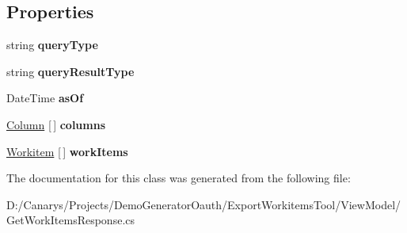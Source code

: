 \subsection*{Properties}
\begin{DoxyCompactItemize}
\item 
\mbox{\label{class_templates_generator_tool_1_1_view_model_1_1_get_work_items_response_1_1_results_ad097654d3c3272b51763ff99d77a27b6}} 
string {\bfseries query\+Type}
\item 
\mbox{\label{class_templates_generator_tool_1_1_view_model_1_1_get_work_items_response_1_1_results_a248db1d152bcfff6a9d7ba9ff21d4f5c}} 
string {\bfseries query\+Result\+Type}
\item 
\mbox{\label{class_templates_generator_tool_1_1_view_model_1_1_get_work_items_response_1_1_results_a7f4860e5679fa71f02e35bde6c3e69cf}} 
Date\+Time {\bfseries as\+Of}
\item 
\mbox{\label{class_templates_generator_tool_1_1_view_model_1_1_get_work_items_response_1_1_results_aefea24688f8ef1eb424dfe4c522c3c2b}} 
\mbox{\hyperlink{class_templates_generator_tool_1_1_view_model_1_1_get_work_items_response_1_1_column}{Column}} \mbox{[}$\,$\mbox{]} {\bfseries columns}
\item 
\mbox{\label{class_templates_generator_tool_1_1_view_model_1_1_get_work_items_response_1_1_results_adc6c859214c98b6b41e17ef5e7b899b2}} 
\mbox{\hyperlink{class_templates_generator_tool_1_1_view_model_1_1_get_work_items_response_1_1_workitem}{Workitem}} \mbox{[}$\,$\mbox{]} {\bfseries work\+Items}
\end{DoxyCompactItemize}


The documentation for this class was generated from the following file\+:\begin{DoxyCompactItemize}
\item 
D\+:/\+Canarys/\+Projects/\+Demo\+Generator\+Oauth/\+Export\+Workitems\+Tool/\+View\+Model/Get\+Work\+Items\+Response.\+cs\end{DoxyCompactItemize}
